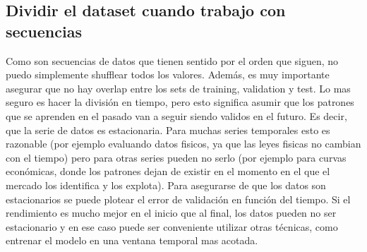 \subsection{Dividir el dataset cuando trabajo con secuencias}
Como son secuencias de datos que tienen sentido por el orden que siguen, no puedo simplemente shufflear todos los valores. Además, es muy importante asegurar que no hay overlap entre los sets de training, validation y test. Lo mas seguro es hacer la división en tiempo, pero esto significa asumir que los patrones que se aprenden en el pasado van a seguir siendo validos en el futuro. Es decir, que la serie de datos es estacionaria. Para muchas series temporales esto es razonable (por ejemplo evaluando datos fisicos, ya que las leyes fisicas no cambian con el tiempo) pero para otras series pueden no serlo (por ejemplo para curvas económicas, donde los patrones dejan de existir en el momento en el que el mercado los identifica y los explota). Para asegurarse de que los datos son estacionarios se puede plotear el error de validación en función del tiempo. Si el rendimiento es mucho mejor en el inicio que al final, los datos pueden no ser estacionario y en ese caso puede ser conveniente utilizar otras técnicas, como entrenar el modelo en una ventana temporal mas acotada. 
